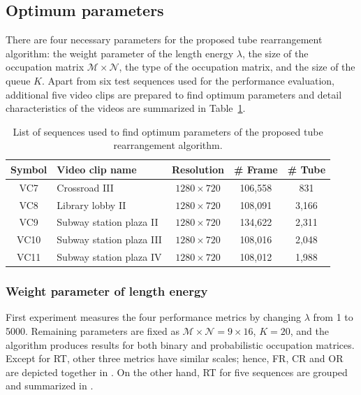 \documentclass[11pt]{hyu_thesis}
\begin{document}
\subsection{Optimum parameters}
\label{sec:exp:param}
There are four necessary parameters for the proposed tube rearrangement algorithm: the weight parameter of the length energy $\lambda$, the size of the occupation matrix $\mathcal{M}\times\mathcal{N}$, the type of the occupation matrix, and the size of the queue $K$. Apart from six test sequences used for the performance evaluation, additional five video clips are prepared to find optimum parameters and detail characteristics of the videos are summarized in Table~\ref{tb:video_param}.
\begin{table}
	\begin{center}
		\begin{tabular}{clccc}
			\hline
			\hline
			Symbol & Video clip name & Resolution & \# Frame & \# Tube\\
			\hline
			\hline
			VC7 & Crossroad III & $1280 \times 720$ & 106,558 & 831 \\
			\hline
			VC8 & Library lobby II & $1280 \times 720$ & 108,091 & 3,166 \\
			\hline
			VC9 & Subway station plaza II & $1280 \times 720$ & 134,622 & 2,311 \\
			\hline
			VC10 & Subway station plaza III & $1280 \times 720$ & 108,016 & 2,048 \\
			\hline
			VC11 & Subway station plaza IV & $1280 \times 720$ & 108,012 & 1,988 \\
			\hline
		\end{tabular}
	\end{center}
	\caption{List of sequences used to find optimum parameters of the proposed tube rearrangement algorithm.}
	\label{tb:video_param}
\end{table}

\subsubsection{Weight parameter of length energy}
\label{sec:exp:weight}
First experiment measures the four performance metrics by changing $\lambda$ from 1 to 5000. Remaining parameters are fixed as $\mathcal{M}\times\mathcal{N}=9\times16$, $K=20$, and the algorithm produces results for both binary and probabilistic occupation matrices. Except for RT, other three metrics have similar scales; hence, FR, CR and OR are depicted together in . On the other hand, RT for five sequences are grouped and summarized in . 
\end{document}

